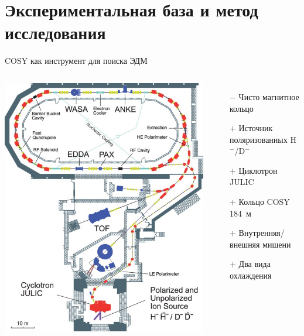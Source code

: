 \documentclass[14pt]{beamer}
\begin{document}
\section{Экспериментальная база и метод исследования}
\begin{frame}{COSY как инструмент для поиска ЭДМ}
	\begin{columns}
		\centering
		\includegraphics[width=.95\linewidth]{COSY_facility}
		\begin{itemize}
			\item[$-$] Чисто магнитное кольцо
			\item[$+$] Источник поляризованных H$^-$/D$^-$
			\item[$+$] Циклотрон JULIC
			\item[$+$] Кольцо COSY 184~м
			\item[$+$] Внутренняя/внешняя мишени
			\item[$+$] Два вида охлаждения
		\end{itemize}
	\end{columns}
	
\end{frame}
\end{document}
